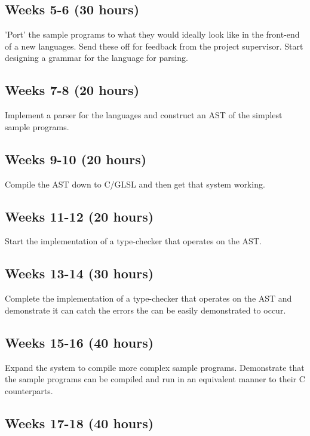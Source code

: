 \documentclass[11pt]{article}
\begin{document}
\subsection{Weeks 5-6 (30 hours)}

'Port' the sample programs to what they would ideally look like in the
front-end of a new languages. Send these off for feedback from the project
supervisor. Start designing a grammar for the language for parsing.

\subsection{Weeks 7-8 (20 hours)}

Implement a parser for the languages and construct an AST of the simplest
sample programs.

\subsection{Weeks 9-10 (20 hours)}

Compile the AST down to C/GLSL and then get that system working.

\subsection{Weeks 11-12 (20 hours)}

Start the implementation of a type-checker that operates on the AST.

\subsection{Weeks 13-14 (30 hours)}

Complete the implementation of a type-checker that operates on the AST and
demonstrate it can catch the errors the can be easily demonstrated to occur.

\subsection{Weeks 15-16 (40 hours)}

Expand the system to compile more complex sample programs. Demonstrate that the
sample programs can be compiled and run in an equivalent manner to their C
counterparts.

\subsection{Weeks 17-18 (40 hours)}
\end{document}
